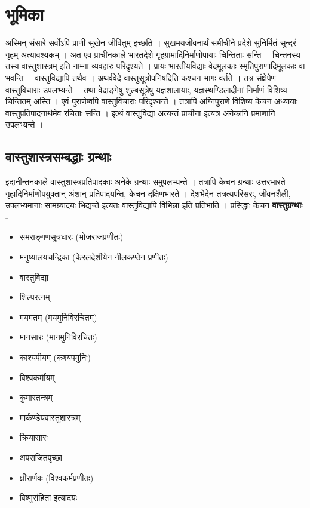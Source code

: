 \chapter{भूमिका}

अस्मिन् संसारे सर्वोऽपि प्राणी सुखेन जीवितुम् इच्छति । सुखमयजीवनार्थं समीचीने प्रदेशे सुनिर्मितं सुन्दरं गृहम् अत्यावश्यकम् । अत एव प्राचीनकाले भारतदेशे गृहग्रामादिनिर्माणोपायाः चिन्तिताः सन्ति । चिन्तनस्य तस्य वास्तुशास्त्रम् इति नाम्ना व्यवहारः परिदृश्यते । प्रायः भारतीयविद्याः वेदमूलकाः स्मृतिपुराणादिमूलकाः वा भवन्ति । वास्तुविद्यापि तथैव । अथर्ववेदे वास्तुसूत्रोपनिषदिति कश्चन भागः वर्तते । तत्र संक्षेपेण वास्तुविचाराः उपलभ्यन्ते । तथा वेदाङ्गेषु शुल्बसूत्रेषु यज्ञशालायाः, यज्ञस्थण्डिलादीनां निर्माणं विशिष्य चिन्तितम् अस्ति । एवं पुराणेष्वपि वास्तुविचाराः परिदृश्यन्ते । तत्रापि अग्निपुराणे विशिष्य केचन अध्यायाः वास्तुप्रतिपादनार्थमेव रचिताः सन्ति । इत्थं वास्तुविद्या अत्यन्तं प्राचीना इत्यत्र अनेकानि प्रमाणानि उपलभ्यन्ते । 

\section{वास्तुशास्त्रसम्बद्धाः ग्रन्थाः}

इदानीन्तनकाले वास्तुशास्त्रप्रतिपादकाः अनेके ग्रन्थाः समुपलभ्यन्ते । तत्रापि केचन ग्रन्थाः उत्तरभारते गृहादिनिर्माणोपयुक्तान् अंशान् प्रतिपादयन्ति, केचन दक्षिणभारते । देशभेदेन तत्रत्यपरिसरः, जीवनशैली, उपलभ्यमानाः सामग्र्यादयः भिद्यन्ते इत्यतः वास्तुविद्यापि विभिन्ना इति प्रतिभाति । प्रसिद्धाः केचन {\b\bfseries वास्तुग्रन्थाः -}
\begin{itemize}
\item समराङ्गणसूत्रधारः  (भोजराजप्रणीतः)
\item मनुष्यालयचन्द्रिका (केरलदेशीयेन नीलकण्ठेन प्रणीतः)
\item वास्तुविद्या 
\item शिल्परत्नम्
\item मयमतम् (मयमुनिविरचितम्)
\item मानसारः (मानमुनिविरचितः)
\item काश्यपीयम् (कश्यपमुनिः)
\item विश्वकर्मीयम्
\item कुमारतन्त्रम्
\item मार्कण्डेयवास्तुशास्त्रम्
\item क्रियासारः
\item अपराजितपृच्छा
\item क्षीरार्णवः (विश्वकर्मप्रणीतः)
\item विष्णुसंहिता  इत्यादयः
\end{itemize}

